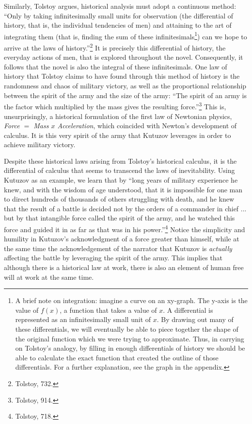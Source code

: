 \documentclass[12pt]{article}
\begin{document}
Similarly, Tolstoy argues, historical analysis must adopt a continuous method: ``Only by taking infinitesimally small units for observation (the differential of history, that is, the individual tendencies of men) and attaining to the art of integrating them (that is, finding the sum of these infinitesimals\footnote{A brief note on integration: imagine a curve on an xy-graph. The y-axis is the value of $f(x)$, a function that takes a value of $x$. A differential is represented as an infinitesimally small unit of $x$. By drawing out many of these differentials, we will eventually be able to piece together the shape of the original function which we were trying to approximate. Thus, in carrying on Tolstoy's analogy, by filling in enough differentials of history we should be able to calculate the exact function that created the outline of those differentials. For a further explanation, see the graph in the appendix.}) can we hope to arrive at the laws of history.''\footnote{Tolstoy, 732.} It is precisely this differential of history, the everyday actions of men, that is explored throughout the novel. Consequently, it follows that the novel is also the integral of these infinitesimals. One law of history that Tolstoy claims to have found through this method of history is the randomness and chaos of military victory, as well as the proportional relationship between the spirit of the army and the size of the army: ``The spirit of an army is the factor which multiplied by the mass gives the resulting force.''\footnote{Tolstoy, 914.} This is, unsurprisingly, a historical formulation of the first law of Newtonian physics, \emph{Force $=$ Mass $x$ Acceleration}, which coincided with Newton’s development of calculus. It is this very spirit of the army that Kutuzov leverages in order to achieve military victory.

Despite these historical laws arising from Tolstoy's historical calculus, it is the differential of calculus that seems to transcend the laws of inevitability. Using Kutuzov as an example, we learn that by ``long years of military experience he knew, and with the wisdom of age understood, that it is impossible for one man to direct hundreds of thousands of others struggling with death, and he knew that the result of a battle is decided not by the orders of a commander in chief ... but by that intangible force called the spirit of the army, and he watched this force and guided it in as far as that was in his power.''\footnote{Tolstoy, 718.} Notice the simplicity and humility in Kutuzov's acknowledgment of a force greater than himself, while at the same time the acknowledgement of the narrator that Kutuzov is \emph{actually} affecting the battle by leveraging the spirit of the army. This implies that although there is a historical law at work, there is also an element of human free will at work at the same time.
\end{document}

